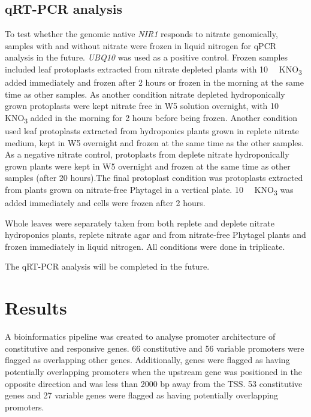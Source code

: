 \subsection{qRT-PCR analysis}
{\label{qrt-pcr-analysis}}

To test whether the genomic native \textit{NIR1} responds to nitrate
genomically, samples with and without nitrate were frozen in liquid
nitrogen for qPCR analysis in the future. \textit{UBQ10} was used as a
positive control. Frozen samples included leaf protoplasts extracted
from nitrate depleted plants with \SI{10}{\milli\Molar} KNO\textsubscript{3} added immediately and frozen after 2 hours or frozen in the morning at the
same time as other samples. As another condition nitrate depleted
hydroponically grown protoplasts were kept nitrate free in W5 solution
overnight, with \SI{10}{\milli\Molar} KNO\textsubscript{3} added in the morning for 2
hours before being frozen. Another condition used leaf protoplasts
extracted from hydroponics plants grown in replete nitrate medium, kept in W5 overnight and frozen at the same time as the other samples. As a negative nitrate control, protoplasts from deplete nitrate
hydroponically grown plants were kept in W5 overnight and frozen at the same time as other samples (after 20 hours).The final protoplast
condition was protoplasts extracted from plants grown on nitrate\hyp{}free
Phytagel in a vertical plate. \SI{10}{\milli\Molar} KNO\textsubscript{3} was added
immediately and cells were frozen after 2 hours.

Whole leaves were separately taken from both replete and deplete nitrate hydroponics plants, replete nitrate agar and from nitrate\hyp{}free Phytagel plants and frozen immediately in liquid nitrogen. All conditions were done in triplicate.

The qRT\hyp{}PCR analysis will be completed in the future.

\section{Results}\label{results}

A bioinformatics pipeline was created to analyse promoter architecture of constitutive and responsive genes.
66 constitutive and 56 variable promoters were flagged as overlapping other genes.
Additionally, genes were flagged as having potentially overlapping promoters when the upstream gene was positioned in the opposite direction and was less than 2000 bp away from the TSS.
53 constitutive genes and 27 variable genes were flagged as having
potentially overlapping promoters.

